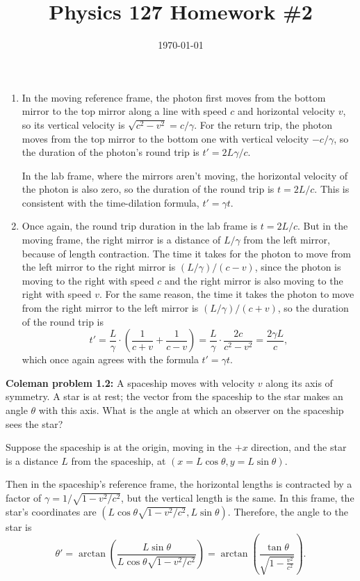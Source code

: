 \documentclass{article}
\date{\today}
\title{Physics 127 Homework \#2}
\begin{document}
\maketitle

\begin{prob}
\end{prob}
\begin{enumerate}[label=(\alph*)]
    \item In the moving reference frame, the photon first moves from the bottom mirror to the top mirror along a line with speed $c$ and horizontal velocity $v$, so its vertical velocity is $\sqrt{c^2-v^2}=c/\gamma$. For the return trip, the photon moves from the top mirror to the bottom one with vertical velocity $-c/\gamma$, so the duration of the photon's round trip is $t'=2L\gamma/c$.
        \par
        In the lab frame, where the mirrors aren't moving, the horizontal velocity of the photon is also zero, so the duration of the round trip is $t=2L/c$. This is consistent with the time-dilation formula, $t'=\gamma t$.
    \item Once again, the round trip duration in the lab frame is $t=2L/c$. But in the moving frame, the right mirror is a distance of $L/\gamma$ from the left mirror, because of length contraction. The time it takes for the photon to move from the left mirror to the right mirror is $(L/\gamma)/(c-v)$, since the photon is moving to the right with speed $c$ and the right mirror is also moving to the right with speed $v$. For the same reason, the time it takes the photon to move from the right mirror to the left mirror is $(L/\gamma)/(c+v)$, so the duration of the round trip is
        \[ t' = \frac{L}{\gamma} \cdot \left( \frac{1}{c+v}+ \frac{1}{c-v} \right) = \frac{L}{\gamma} \cdot \frac{2c}{c^2-v^2} = \frac{2 \gamma L}{c}, \]
        which once again agrees with the formula $t'=\gamma t$.
\end{enumerate}

\bigskip
\par
\begin{prob}
    \textbf{Coleman problem 1.2:} A spaceship moves with velocity $v$ along its axis of symmetry. A star is at rest; the vector from the spaceship to the star makes an angle $\theta$ with this axis. What is the angle at which an observer on the spaceship sees the star?
\end{prob}
Suppose the spaceship is at the origin, moving in the $+x$ direction, and the star is a distance $L$ from the spaceship, at $(x=L\cos \theta, y=L\sin \theta)$.
\par
Then in the spaceship's reference frame, the horizontal lengths is contracted by a factor of $\gamma = 1/\sqrt{1-v^2/c^2}$, but the vertical length is the same. In this frame, the star's coordinates are $ (L \cos \theta \sqrt{1-v^2/c^2}, L \sin \theta)$. Therefore, the angle to the star is
\[ \theta' = \arctan \left( \frac{L \sin \theta}{L \cos \theta \sqrt{1-v^2/c^2}} \right) = \arctan \left( \frac{\tan\theta}{\sqrt{1 - \frac{v^2}{c^2}}} \right). \]
\end{document}
